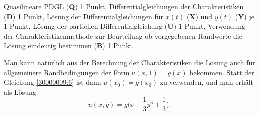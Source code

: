 \begin{bewertung}
Quasilineare PDGL ({\bf Q}) 1 Punkt,
Differentialgleichungen der Charakteristiken ({\bf D}) 1 Punkt,
Lösung der Differentialgleichungen für $x(t)$ ({\bf X})
und $y(t)$ ({\bf Y}) je 1 Punkt,
Lösung der partiellen Differentialgleichung ({\bf U}) 1 Punkt,
Verwendung der Charakteristikenmethode zur Beurteilung ob
vorgegebenen Randwerte die Lösung eindeutig bestimmen ({\bf B}) 1 Punkt.
\end{bewertung}

\begin{diskussion}
Man kann natürlich aus der Berechnung der Charakteristiken die Lösung
auch für allgemeinere Randbedingungen der Form $u(x,1)=g(x)$ bekommen.
Statt der Gleichung \eqref{30000009:6} ist dann
$u(x_0)=g(x_0)$ zu verwenden, und man erhält als Lösung
\[
u(x,y)=g\biggl(
x- \frac13y^3+\frac13
\biggr).
\]
\end{diskussion}
